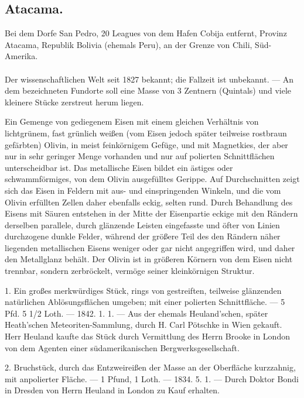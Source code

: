 \documentclass[a4paper, 11pt, oneside, polutonikogreek, german]{article}
\begin{document}
\subsection[--- Meteoreisen --- Nr. 70 bis 94. --- Atacama.]{Atacama.}
\begin{center}
\small
Bei dem Dorfe San Pedro, 20 Leagues von dem Hafen Cobija entfernt, Provinz Atacama, Republik Bolivia (ehemals Peru), an der Grenze von Chili, Süd-Amerika.
\end{center}
\paragraph{}
Der wissenschaftlichen Welt seit 1827 bekannt; die Fallzeit ist unbekannt. — An dem bezeichneten Fundorte soll eine Masse von 3 Zentnern (Quintals) und viele kleinere Stücke zerstreut herum liegen.

Ein Gemenge von gediegenem Eisen mit einem gleichen Verhältnis von lichtgrünem, fast grünlich weißen (vom Eisen jedoch später teilweise rostbraun gefärbten) Olivin, in meist feinkörnigem Gefüge, und mit Magnetkies, der aber nur in sehr geringer Menge vorhanden und nur auf polierten Schnittflächen unterscheidbar ist. Das metallische Eisen bildet ein ästiges oder schwammförmiges, von dem Olivin ausgefülltes Gerippe. Auf Durchschnitten zeigt sich das Eisen in Feldern mit aus- und einspringenden Winkeln, und die vom Olivin erfüllten Zellen daher ebenfalls eckig, selten rund. Durch Behandlung des Eisens mit Säuren entstehen in der Mitte der Eisenpartie eckige mit den Rändern derselben parallele, durch glänzende Leisten eingefasste und öfter von Linien durchzogene dunkle Felder, während der größere Teil des den Rändern näher liegenden metallischen Eisens weniger oder gar nicht angegriffen wird, und daher den Metallglanz behält. Der Olivin ist in größeren Körnern von dem Eisen nicht trennbar, sondern zerbröckelt, vermöge seiner kleinkörnigen Struktur.

1. Ein großes merkwürdiges Stück, rings von gestreiften, teilweise glänzenden natürlichen Ablösungsflächen umgeben; mit einer polierten Schnittfläche. — 5 Pfd. 5 1/2 Loth. — 1842. 1. 1. — Aus der ehemals Heuland'schen, später Heath'schen Meteoriten-Sammlung, durch H. Carl Pötschke in Wien gekauft. Herr Heuland kaufte das Stück durch Vermittlung des Herrn Brooke in London von dem Agenten einer südamerikanischen Bergwerksgesellschaft.

2. Bruchstück, durch das Entzweireißen der Masse an der Oberfläche kurzzahnig, mit anpolierter Fläche. — 1 Pfund, 1 Loth. — 1834. 5. 1. — Durch Doktor Bondi in Dresden von Herrn Heuland in London zu Kauf erhalten.
\end{document}
